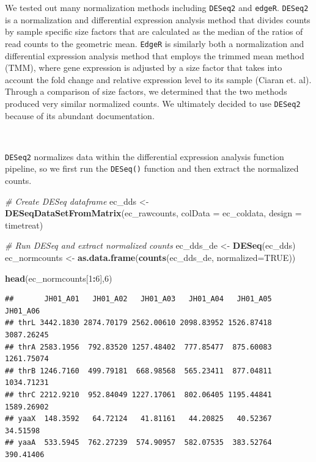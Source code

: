 \documentclass[]{article}
\newenvironment{Shaded}{\begin{snugshade}}{\end{snugshade}}
\newcommand{\KeywordTok}[1]{\textcolor[rgb]{0.13,0.29,0.53}{\textbf{#1}}}
\newcommand{\DataTypeTok}[1]{\textcolor[rgb]{0.13,0.29,0.53}{#1}}
\newcommand{\DecValTok}[1]{\textcolor[rgb]{0.00,0.00,0.81}{#1}}
\newcommand{\StringTok}[1]{\textcolor[rgb]{0.31,0.60,0.02}{#1}}
\newcommand{\CommentTok}[1]{\textcolor[rgb]{0.56,0.35,0.01}{\textit{#1}}}
\newcommand{\OtherTok}[1]{\textcolor[rgb]{0.56,0.35,0.01}{#1}}
\newcommand{\OperatorTok}[1]{\textcolor[rgb]{0.81,0.36,0.00}{\textbf{#1}}}
\newcommand{\NormalTok}[1]{#1}
\begin{document}
We tested out many normalization methods including \texttt{DESeq2} and
\texttt{edgeR}. \texttt{DESeq2} is a normalization and differential
expression analysis method that divides counts by sample specific size
factors that are calculated as the median of the ratios of read counts
to the geometric mean. \texttt{EdgeR} is similarly both a normalization
and differential expression analysis method that employs the trimmed
mean method (TMM), where gene expression is adjusted by a size factor
that takes into account the fold change and relative expression level to
its sample (Ciaran et. al). Through a comparison of size factors, we
determined that the two methods produced very similar normalized counts.
We ultimately decided to use \texttt{DESeq2} because of its abundant
documentation.

\(~\)

\texttt{DESeq2} normalizes data within the differential expression
analysis function pipeline, so we first run the \texttt{DESeq()}
function and then extract the normalized counts.

\begin{Shaded}
\begin{Highlighting}[]
\CommentTok{# Create DESeq dataframe}
\NormalTok{ec_dds <-}\StringTok{ }\KeywordTok{DESeqDataSetFromMatrix}\NormalTok{(ec_rawcounts, }\DataTypeTok{colData =}\NormalTok{ ec_coldata, }
                                 \DataTypeTok{design =} \OperatorTok{~}\StringTok{ }\NormalTok{timetreat)}

\CommentTok{# Run DESeq and extract normalized counts}
\NormalTok{ec_dds_de <-}\StringTok{ }\KeywordTok{DESeq}\NormalTok{(ec_dds)}
\NormalTok{ec_normcounts <-}\StringTok{ }\KeywordTok{as.data.frame}\NormalTok{(}\KeywordTok{counts}\NormalTok{(ec_dds_de, }\DataTypeTok{normalized=}\OtherTok{TRUE}\NormalTok{))}

\KeywordTok{head}\NormalTok{(ec_normcounts[}\DecValTok{1}\OperatorTok{:}\DecValTok{6}\NormalTok{],}\DecValTok{6}\NormalTok{)}
\end{Highlighting}
\end{Shaded}

\begin{verbatim}
##       JH01_A01   JH01_A02   JH01_A03   JH01_A04   JH01_A05   JH01_A06
## thrL 3442.1830 2874.70179 2562.00610 2098.83952 1526.87418 3087.26245
## thrA 2583.1956  792.83520 1257.48402  777.85477  875.60083 1261.75074
## thrB 1246.7160  499.79181  668.98568  565.23411  877.04811 1034.71231
## thrC 2212.9210  952.84049 1227.17061  802.06405 1195.44841 1589.26902
## yaaX  148.3592   64.72124   41.81161   44.20825   40.52367   34.51598
## yaaA  533.5945  762.27239  574.90957  582.07535  383.52764  390.41406
\end{verbatim}
\end{document}
